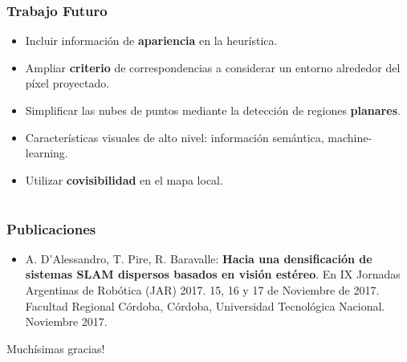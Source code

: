 \documentclass[compress]{beamer}
\begin{document}
\begin{frame}
	\frametitle{Trabajo Futuro}
	\begin{itemize}
		\item Incluir información de \textbf{apariencia} en la heurística.
		\item Ampliar \textbf{criterio} de correspondencias a considerar un entorno alrededor del píxel proyectado.
		\item Simplificar las nubes de puntos mediante la detección de regiones \textbf{planares}.
		\item Características visuales de alto nivel: información semántica, machine-learning.
		\item Utilizar \textbf{covisibilidad} en el mapa local.
	\end{itemize}
\end{frame}


\section*{}




\begin{frame}
    \frametitle{Publicaciones}

	\begin{itemize}
		\item A. D'Alessandro, T. Pire, R. Baravalle: \textbf{Hacia una densificación de sistemas SLAM dispersos basados en visión estéreo}. En IX Jornadas Argentinas de Robótica (JAR) 2017. 15, 16 y 17 de Noviembre de 2017. Facultad Regional Córdoba, Córdoba, Universidad Tecnológica Nacional. Noviembre 2017.
	\end{itemize}
    
\end{frame}


\begin{frame}
	\centering
	\Large{Muchísimas gracias!}	
	\\
	\vspace{2cm}
\end{frame}
\end{document}
